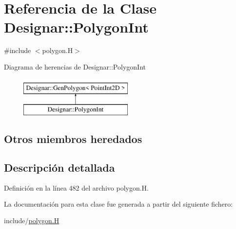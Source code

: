 \hypertarget{class_designar_1_1_polygon_int}{}\section{Referencia de la Clase Designar\+:\+:Polygon\+Int}
\label{class_designar_1_1_polygon_int}


{\ttfamily \#include $<$polygon.\+H$>$}

Diagrama de herencias de Designar\+:\+:Polygon\+Int\begin{figure}[H]
\begin{center}
\leavevmode
\includegraphics[height=2.000000cm]{class_designar_1_1_polygon_int}
\end{center}
\end{figure}
\subsection*{Otros miembros heredados}


\subsection{Descripción detallada}


Definición en la línea 482 del archivo polygon.\+H.



La documentación para esta clase fue generada a partir del siguiente fichero\+:\begin{DoxyCompactItemize}
\item 
include/\hyperlink{polygon_8_h}{polygon.\+H}\end{DoxyCompactItemize}
